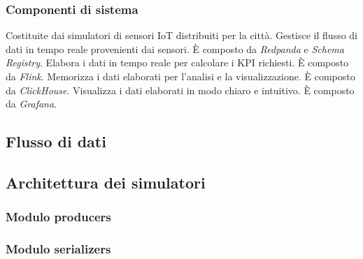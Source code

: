 \subsubsection{Componenti di sistema}
Costituite dai simulatori di sensori IoT distribuiti per la città.
Gestisce il flusso di dati in tempo reale provenienti dai sensori. È composto da \textit{Redpanda} e \textit{Schema Registry}.
Elabora i dati in tempo reale per calcolare i KPI richiesti. È composto da \textit{Flink}.
Memorizza i dati elaborati per l'analisi e la visualizzazione. È composto da \textit{ClickHouse}.
Visualizza i dati elaborati in modo chiaro e intuitivo. È composto da \textit{Grafana}. 

\subsection{Flusso di dati}
\subsection{Architettura dei simulatori}
\subsubsection{Modulo producers}
\subsubsection{Modulo serializers}
